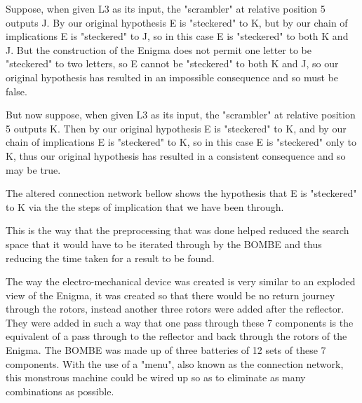 \documentclass[12pt,a4paper]{article}
\begin{document}
Suppose, when given L3 as its input, the "scrambler" at relative position 5 outputs J. By our original hypothesis E is "steckered" to K, but by our chain of implications E is "steckered" to J, so in this case E is "steckered" to both K and J. But the construction of the Enigma does not permit one letter to be "steckered" to two letters, so E cannot be "steckered" to both K and J, so our original hypothesis has resulted in an impossible consequence and so must be false.

But now suppose, when given L3 as its input, the "scrambler" at relative position 5 outputs K. Then by our original hypothesis E is "steckered" to K, and by our chain of implications E is "steckered" to K, so in this case E is "steckered" only to K, thus our original hypothesis has resulted in a consistent consequence and so may be true.

The altered connection network bellow shows the hypothesis that E is "steckered" to K via the the steps of implication that we have been through.

This is the way that the preprocessing that was done helped reduced the search space that it would have to be iterated through by the BOMBE and thus reducing the time taken for a result to be found.

The way the electro-mechanical device was created is very similar to an exploded view of the Enigma, it was created so that there would be no return journey through the rotors, instead another three rotors were added after the reflector. They were added in such a way that one pass through these 7 components is the equivalent of a pass through to the reflector and back through the rotors of the Enigma. The BOMBE was made up of three batteries of 12 sets of these 7 components. With the use of a "menu", also known as the connection network, this monstrous machine could be wired up so as to eliminate as many combinations as possible.\\
\end{document}
